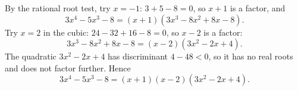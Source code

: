 By the rational root test, try $x=-1$: $3+5-8=0$, so $x+1$ is a factor, and
\[3x^4-5x^3-8=(x+1)(3x^3-8x^2+8x-8).\]
Try $x=2$ in the cubic: $24-32+16-8=0$, so $x-2$ is a factor:
\[3x^3-8x^2+8x-8=(x-2)(3x^2-2x+4).\]
The quadratic $3x^2-2x+4$ has discriminant $4-48<0$, so it has no real roots and does not factor further. Hence
\[3x^{4}-5x^{3}-8=\boxed{(x+1)(x-2)(3x^2-2x+4)}.\]
